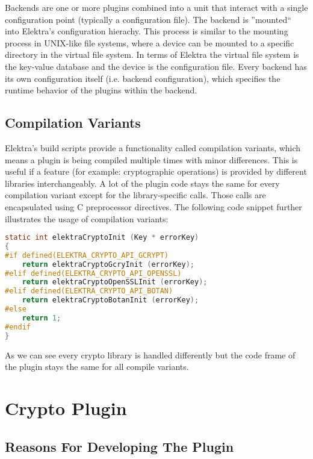 Backends are one or more plugins combined into a unit that interact with a single configuration point (typically a configuration file).
The backend is ''mounted`` into Elektra's configuration hierachy.
This process is similar to the mounting process in UNIX-like file systems, where a device can be mounted to a specific directory in the virtual file system.
In terms of Elektra the virtual file system is the key-value database and the device is the configuration file.
Every backend has its own configuration itself (i.e. backend configuration), which specifies the runtime behavior of the plugins within the backend.

\subsection{Compilation Variants}

Elektra's build scripts provide a functionality called compilation variants, which means a plugin is being compiled multiple times with minor differences.
This is useful if a feature (for example: cryptographic operations) is provided by different libraries interchangeably.
A lot of the plugin code stays the same for every compilation variant except for the library-specific calls.
Those calls are encapsulated using C preprocessor directives.
The following code snippet further illustrates the usage of compilation variants:

\begin{lstlisting}[language=C,caption={Example usage of compilation variants in Elektra}]
static int elektraCryptoInit (Key * errorKey)
{
#if defined(ELEKTRA_CRYPTO_API_GCRYPT)
	return elektraCryptoGcryInit (errorKey);
#elif defined(ELEKTRA_CRYPTO_API_OPENSSL)
	return elektraCryptoOpenSSLInit (errorKey);
#elif defined(ELEKTRA_CRYPTO_API_BOTAN)
	return elektraCryptoBotanInit (errorKey);
#else
	return 1;
#endif
}
\end{lstlisting}

As we can see every crypto library is handled differently but the code frame of the plugin stays the same for all compile variants.

\section{Crypto Plugin}\label{crypto-plugin}

\subsection{Reasons For Developing The Plugin}

